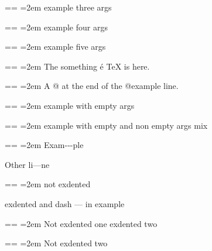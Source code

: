 \documentclass{book}
\makeatletter
\newenvironment{GNUTexinfopreformatted}{%
  \par\obeylines\obeyspaces\frenchspacing
  \parskip=\z@\parindent=\z@}{}
\makeatother
\begin{document}
\begin{titlepage}
\begin{GNUTexinfopreformatted}
\leftskip=2em\relax\ttfamily%
example three args
\end{GNUTexinfopreformatted}

\begin{GNUTexinfopreformatted}
\leftskip=2em\relax\ttfamily%
example four args
\end{GNUTexinfopreformatted}

\begin{GNUTexinfopreformatted}
\leftskip=2em\relax\ttfamily%
example five args
\end{GNUTexinfopreformatted}

\begin{GNUTexinfopreformatted}
\leftskip=2em\relax\ttfamily%
The something \'{e} \TeX{} is here.
\end{GNUTexinfopreformatted}

\begin{GNUTexinfopreformatted}
\leftskip=2em\relax\ttfamily%
A @ at the end of the @example line.
\end{GNUTexinfopreformatted}

\begin{GNUTexinfopreformatted}
\leftskip=2em\relax\ttfamily%
example with empty args
\end{GNUTexinfopreformatted}

\begin{GNUTexinfopreformatted}
\leftskip=2em\relax\ttfamily%
example with empty and non empty args mix
\end{GNUTexinfopreformatted}

\begin{GNUTexinfopreformatted}
\leftskip=2em\relax\ttfamily%
Exam{-}{-}{-}ple

\end{GNUTexinfopreformatted}
\noindent Other li---ne
\begin{GNUTexinfopreformatted}
\leftskip=2em\relax\ttfamily%
not exdented
\end{GNUTexinfopreformatted}

\noindent exdented  and dash --- in example
\begin{GNUTexinfopreformatted}
\leftskip=2em\relax\ttfamily%
Not exdented one
\end{GNUTexinfopreformatted}
\noindent exdented two
\begin{GNUTexinfopreformatted}
\leftskip=2em\relax\ttfamily%
Not exdented two
\end{GNUTexinfopreformatted}


\end{titlepage}
\end{document}
